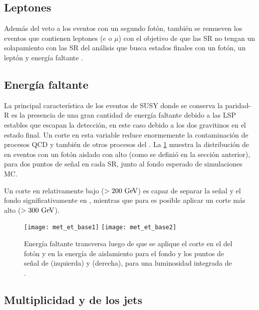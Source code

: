 \subsection{Leptones}\label{sec:leptonphoton_veto}

Además del veto a los eventos con un segundo fotón, también se remueven
los eventos que contienen leptones ($e$ o $\mu$) con el objetivo de que las
SR no tengan un solapamiento con las SR del análisis que busca estados finales
con un fotón, un leptón y energía faltante \cite{ATLAS-CONF-2012-144}.



\subsection{Energía faltante}

La principal característica de los eventos de SUSY donde se conserva
la paridad-R es la presencia de una gran cantidad de energía faltante debido
a las LSP estables que escapan la detección, en este caso debido a los dos gravitinos
en el estado final.
Un corte en esta variable reduce enormemente la contaminación de procesos
QCD y también de otros procesos del {\SM}.
La \cref{fig:opt_met} muestra la distribución de {\met} en eventos con
un fotón aislado con alto {\pt} (como se definió en la sección anterior),
para dos puntos de señal en cada SR, junto al fondo esperado de simulaciones
MC.

Un corte en {\met} relativamente bajo ($> 200 \gev$) es capaz de separar
la señal y el fondo significativamente en {\SRL}, mientras que para {\SRH}
es posible aplicar un corte más alto ($>300\gev$).

\begin{figure}[!h]
  \centering
  \texttt{[image: met\_et\_base1]}
  \texttt{[image: met\_et\_base2]}
  \caption{Energía faltante transversa
    luego de que se aplique el corte en el {\pt} del fotón y en la energía de aislamiento
    para el fondo y los puntos de señal de {\SRL} (izquierda) y {\SRH} (derecha),
    para una luminosidad integrada de {\ilumi}.}

  \label{fig:opt_met}
\end{figure}



\subsection{Multiplicidad y {\pt} de los jets} \label{sec:opt_njet}

